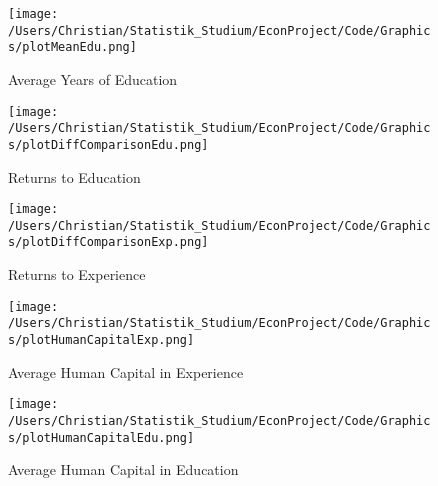 \begin{figure}[!h]
    \centering
    \texttt{[image: /Users/Christian/Statistik\_Studium/EconProject/Code/Graphics/plotMeanEdu.png]}
    \caption{Average Years of Education}
    \label{fig:MeanEdu}
\end{figure}

\begin{figure}[!h]
    \centering
    \texttt{[image: /Users/Christian/Statistik\_Studium/EconProject/Code/Graphics/plotDiffComparisonEdu.png]}
    \caption{Returns to  Education}
    \label{fig:DiffComparisonEdu}
\end{figure}

\begin{figure}[!h]
    \centering
    \texttt{[image: /Users/Christian/Statistik\_Studium/EconProject/Code/Graphics/plotDiffComparisonExp.png]}
    \caption{Returns to Experience}
    \label{fig:DiffComparisonExp}
\end{figure}


\begin{figure}[!h]
    \centering
    \texttt{[image: /Users/Christian/Statistik\_Studium/EconProject/Code/Graphics/plotHumanCapitalExp.png]}
    \caption{Average Human Capital in Experience}
    \label{fig:HumanCapitalExp}
\end{figure}

\begin{figure}[!h]
    \centering
    \texttt{[image: /Users/Christian/Statistik\_Studium/EconProject/Code/Graphics/plotHumanCapitalEdu.png]}
    \caption{Average Human Capital in Education}
    \label{fig:HumanCapitalEdu}
\end{figure}
\FloatBarrier
